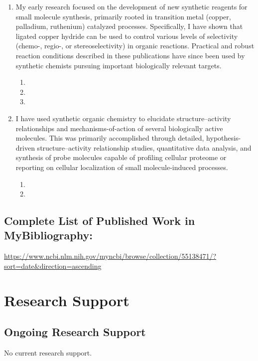 \documentclass{nihbiosketch}
\begin{document}
\begin{enumerate}

\item My early research focused on the development of new synthetic reagents for small molecule synthesis, primarily rooted in transition metal (copper, palladium, ruthenium) catalyzed processes. Specifically, I have shown that ligated copper hydride can be used to control various levels of selectivity (chemo-, regio-, or stereoselectivity) in organic reactions. Practical and robust reaction conditions described in these publications have since been used by synthetic chemists pursuing important biologically relevant targets. 
\begin{enumerate}
\item {}
\item {}
\item {}
\end{enumerate} 

\item I have used synthetic organic chemistry to elucidate structure--activity relationships and mechanisms-of-action of several biologically active molecules. This was primarily accomplished through detailed, hypothesis-driven structure--activity relationship studies, quantitative data analysis, and synthesis of probe molecules capable of profiling cellular proteome or reporting on cellular localization of small molecule-induced processes.
\begin{enumerate}
\item {}
\item {}
\end{enumerate}
\end{enumerate}

\subsection*{Complete List of Published Work in MyBibliography:} 
\url{https://www.ncbi.nlm.nih.gov/myncbi/browse/collection/55138471/?sort=date&direction=ascending}



\section{Research Support}

\subsection*{Ongoing Research Support}
No current research support.
\end{document}
